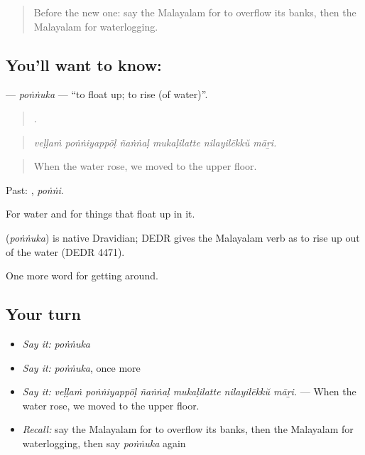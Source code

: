 \label{lesson:ML-C512-ponnuka}



\begin{quote}
Before the new one: say the Malayalam for to overflow its banks, then the Malayalam for waterlogging.
\end{quote}

\subsection*{You'll want to know: }
\textbf{} — \emph{poṅṅuka} — \textquotedblleft{}to float up; to rise (of water)\textquotedblright{}.

\begin{quote}
     .
\end{quote}

\begin{quote}
\emph{veḷḷaṁ poṅṅiyappōḷ ñaṅṅaḷ mukaḷilatte nilayilēkkŭ māṟi.}
\end{quote}

\begin{quote}
When the water rose, we moved to the upper floor.
\end{quote}

Past: , \emph{poṅṅi}.

For water and for things that float up in it.

\begin{cousinweb}
\textbf{} (\emph{poṅṅuka}) is native Dravidian; DEDR gives the Malayalam verb as to rise up out of the water (DEDR 4471).
\end{cousinweb}

\begin{grammarlens}[title={What you've built}]
One more word for getting around.
\end{grammarlens}

\subsection*{Your turn}
\begin{itemize}
\raggedright
  \item \emph{Say it:} \emph{poṅṅuka}
  \item \emph{Say it:} \emph{poṅṅuka}, once more
  \item \emph{Say it:} \emph{veḷḷaṁ poṅṅiyappōḷ ñaṅṅaḷ mukaḷilatte nilayilēkkŭ māṟi.} — When the water rose, we moved to the upper floor.
  \item \emph{Recall:} say the Malayalam for to overflow its banks, then the Malayalam for waterlogging, then say \emph{poṅṅuka} again
\end{itemize}


